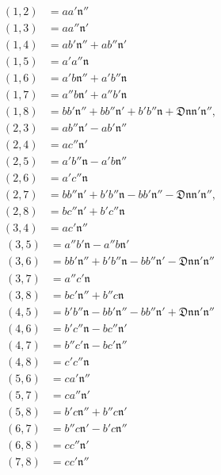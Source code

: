 \[
\begin{aligned}
(1,2)&=aa'\mathfrak{n}''\\
(1,3)&=aa''\mathfrak{n}'\\
(1,4)&=ab'\mathfrak{n}''+ab''\mathfrak{n}'\\
(1,5)&=a'a''\mathfrak{n}\\
(1,6)&=a'b\mathfrak{n}''+a'b''\mathfrak{n}\\
(1,7)&=a''b\mathfrak{n}'+a''b'\mathfrak{n}\\
(1,8)&=bb'\mathfrak{n}''+bb''\mathfrak{n}'+b'b''\mathfrak{n}+\mathfrak{D}\mathfrak{n}\mathfrak{n}'\mathfrak{n}'',\\
(2,3)&=ab''\mathfrak{n}'-ab'\mathfrak{n}''\\
(2,4)&=ac''\mathfrak{n}'\\
(2,5)&=a'b''\mathfrak{n}-a'b\mathfrak{n}''\\
(2,6)&=a'c''\mathfrak{n}\\
(2,7)&=bb''\mathfrak{n}'+b'b''\mathfrak{n}-bb'\mathfrak{n}''-\mathfrak{D}\mathfrak{n}\mathfrak{n}'\mathfrak{n}'',\\
(2,8)&=bc''\mathfrak{n}'+b'c''\mathfrak{n}\\
(3,4)&=ac'\mathfrak{n}''
\end{aligned}
\]
\[
\begin{aligned}
(3,5)&=a''b'\mathfrak{n}-a''b\mathfrak{n}'\\
(3,6)&=bb'\mathfrak{n}''+b'b''\mathfrak{n}-bb''\mathfrak{n}'-\mathfrak{D}\mathfrak{n}\mathfrak{n}'\mathfrak{n}''\\
(3,7)&=a''c'\mathfrak{n}\\
(3,8)&=bc'\mathfrak{n}''+b''c\mathfrak{n}\\
(4,5)&=b'b''\mathfrak{n}-bb'\mathfrak{n}''-bb''\mathfrak{n}'+\mathfrak{D}\mathfrak{n}\mathfrak{n}'\mathfrak{n}''\\
(4,6)&=b'c''\mathfrak{n}-bc''\mathfrak{n}'\\
(4,7)&=b''c'\mathfrak{n}-bc'\mathfrak{n}''\\
(4,8)&=c'c''\mathfrak{n}\\
(5,6)&=ca'\mathfrak{n}''\\
(5,7)&=ca''\mathfrak{n}'\\
(5,8)&=b'c\mathfrak{n}''+b''c\mathfrak{n}'\\
(6,7)&=b''c\mathfrak{n}'-b'c\mathfrak{n}''\\
(6,8)&=cc''\mathfrak{n}'\\
(7,8)&=cc'\mathfrak{n}''
\end{aligned}
\]
